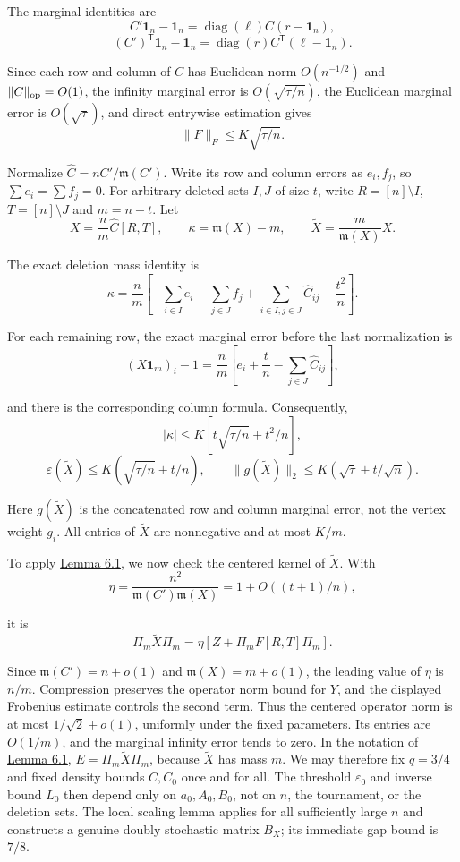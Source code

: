 \documentclass[11pt,a4paper]{article}
\newcommand{\paperref}[2]{\hyperref[#1]{#2}}
\begin{document}
The marginal identities are
\[C'\mathbf 1_n-\mathbf 1_n=\operatorname{diag}(\ell)C(r-\mathbf 1_n),\]
\nopagebreak[3]\[(C')^{\mathsf T}\mathbf 1_n-\mathbf 1_n=\operatorname{diag}(r)C^{\mathsf T}(\ell-\mathbf 1_n).\]

Since each row and column of \(C\) has Euclidean norm \(O(n^{-1/2})\) and \(\|C\|_{\rm op}=O(1)\), the infinity marginal error is \(O(\sqrt{\tau/n})\), the Euclidean marginal error is \(O(\sqrt\tau)\), and direct entrywise estimation gives
\[\|F\|_F\le K\sqrt{\tau/n}.\]

Normalize \(\widehat C=nC'/\mathfrak m(C')\). Write its row and column errors as \(e_i,f_j\), so \(\sum e_i=\sum f_j=0\). For arbitrary deleted sets \(I,J\) of size \(t\), write \(R=[n]\setminus I\), \(T=[n]\setminus J\) and \(m=n-t\). Let
\[X=\frac n m\widehat C[R,T],\qquad \kappa=\mathfrak m(X)-m,\qquad \widetilde X=\frac m{\mathfrak m(X)}X.\]

The exact deletion mass identity is
\begin{equation}
\kappa=\frac n m\left[-\sum_{i\in I}e_i-\sum_{j\in J}f_j+\sum_{i\in I,j\in J}\widehat C_{ij}-\frac{t^2}{n}\right].
\tag{6.1}\label{eq-deletion-mass}
\end{equation}

For each remaining row, the exact marginal error before the last normalization is
\[(X\mathbf 1_m)_i-1=\frac n m\left[e_i+\frac t n-\sum_{j\in J}\widehat C_{ij}\right],\]

and there is the corresponding column formula. Consequently,
\[|\kappa|\le K\left[t\sqrt{\tau/n}+t^2/n\right],\]
\nopagebreak[3]\[\varepsilon(\widetilde X)\le K(\sqrt{\tau/n}+t/n),\qquad \|g(\widetilde X)\|_2\le K(\sqrt\tau+t/\sqrt n).\]

Here \(g(\widetilde X)\) is the concatenated row and column marginal error, not the vertex weight \(g_i\). All entries of \(\widetilde X\) are nonnegative and at most \(K/m\).

To apply \paperref{thm-6.1}{Lemma 6.1}, we now check the centered kernel of \(\widetilde X\). With
\[\eta=\frac{n^2}{\mathfrak m(C')\mathfrak m(X)}=1+O((t+1)/n),\]

it is
\[\Pi_m\widetilde X\Pi_m=\eta\left[Z+\Pi_mF[R,T]\Pi_m\right].\]

Since \(\mathfrak m(C')=n+o(1)\) and \(\mathfrak m(X)=m+o(1)\), the leading value of \(\eta\) is \(n/m\). Compression preserves the operator norm bound for \(Y\), and the displayed Frobenius estimate controls the second term. Thus the centered operator norm is at most \(1/\sqrt2+o(1)\), uniformly under the fixed parameters. Its entries are \(O(1/m)\), and the marginal infinity error tends to zero. In the notation of \paperref{thm-6.1}{Lemma 6.1}, \(E=\Pi_m\widetilde X\Pi_m\), because \(\widetilde X\) has mass \(m\). We may therefore fix \(q=3/4\) and fixed density bounds \(C,C_0\) once and for all. The threshold \(\varepsilon_0\) and inverse bound \(L_0\) then depend only on \(a_0,A_0,B_0\), not on \(n\), the tournament, or the deletion sets. The local scaling lemma applies for all sufficiently large \(n\) and constructs a genuine doubly stochastic matrix \(B_X\); its immediate gap bound is \(7/8\).
\end{document}
